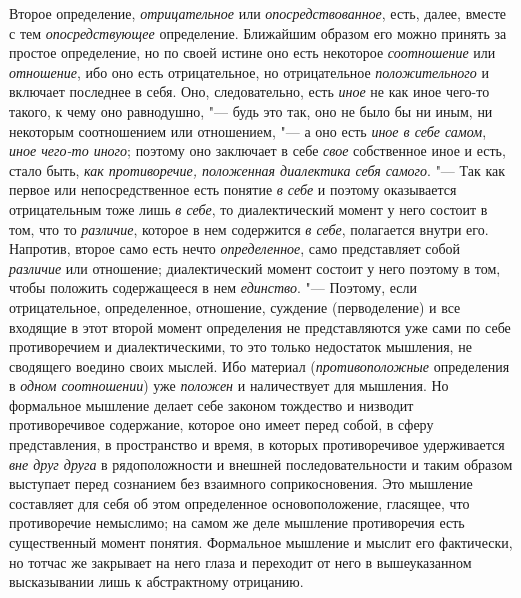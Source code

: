 {{Второе определение, {\em отрицательное} или
{\em опосредствованное}, есть, далее, вместе с тем {\em опосредствующее}
определение. Ближайшим образом его можно принять за простое
определение, но по своей истине оно есть некоторое
{\em соотношение} или {\em отношение}, ибо оно
есть отрицательное, но отрицательное {\em положительного} и
включает последнее в себя. Оно, следовательно, есть {\em иное} не как
иное чего-то такого, к чему оно равнодушно, "--- будь это
так, оно не было бы ни иным, ни некоторым соотношением или отношением, "---
а оно есть {\em иное в
себе самом}, {\em иное чего-то иного}; поэтому оно заключает в себе
{\em свое} собственное иное и есть, стало быть, {\em как
противоречие, положенная диалектика себя самого}. "--- Так как
первое или непосредственное есть понятие {\em в себе} и поэтому
оказывается отрицательным тоже лишь {\em в себе}, то
диалектический момент у него состоит в том, что то
{\em различие}, которое в нем содержится {\em в себе},
полагается внутри его. Напротив, второе само есть нечто
{\em определенное}, само представляет собой {\em различие}
или отношение; диалектический момент состоит у него поэтому в
том, чтобы положить содержащееся в нем {\em единство}. "---
Поэтому, если отрицательное, определенное, отношение,
суждение (перводеление) и все входящие в этот второй момент определения не
представляются уже сами по себе противоречием и диалектическими, то это
только недостаток мышления, не сводящего воедино своих мыслей. Ибо материал
({\em противоположные} определения в {\em одном соотношении}) уже
{\em положен} и наличествует для мышления. Но формальное мышление делает
себе законом тождество и низводит противоречивое содержание,
которое оно имеет перед собой, в сферу представления, в пространство и
время, в которых противоречивое удерживается {\em вне друг друга} в
рядоположности и внешней последовательности и таким образом выступает перед
сознанием без взаимного соприкосновения. Это мышление составляет для себя
об этом определенное основоположение, гласящее, что противоречие немыслимо;
на самом же деле мышление противоречия есть существенный момент понятия.
Формальное мышление и мыслит его фактически, но тотчас же закрывает на него
глаза и переходит от него в вышеуказанном высказывании лишь к абстрактному
отрицанию.

}}
